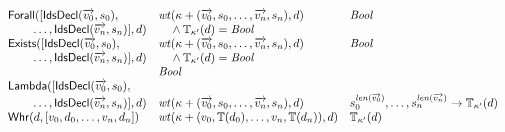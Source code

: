 \documentclass[fleqn,a4paper]{article}
\newcommand{\aterm}[1]{\mathsf{#1}}
\newcommand{\type}{\mathbb{T}}
\newcommand{\wt}{\nm{wt}}
\begin{document}
\begin{displaymath}
\begin{array}{lll}
\aterm{Forall}([\aterm{IdsDecl}(\vect{v_0},s_0),\
                                     &  \wt(\kappa+(\vect{v_0},s_0,\dots,\vect{v_n},s_n),d)       & \Bool\\
\t2\dots,\aterm{IdsDecl}(\vect{v_n},s_n)], d)
                                     & \t1\land\type_{\kappa'}(d)=\Bool                                     &\\
\aterm{Exists}([\aterm{IdsDecl}(\vect{v_0},s_0),
                                     & \wt(\kappa+(\vect{v_0},s_0,\dots,\vect{v_n},s_n),d)        & \Bool\\
\t2\dots,\aterm{IdsDecl}(\vect{v_n},s_n)], d)
                                     & \t1\land\type_{\kappa'}(d)=\Bool                                     &\\
                   & \Bool\\
\aterm{Lambda}([\aterm{IdsDecl}(\vect{v_0},s_0),\\
\t2\dots,\aterm{IdsDecl}(\vect{v_n},s_n)], d)
                                    & \wt(\kappa+(\vect{v_0},s_0,\dots,\vect{v_n},s_n),d)         & s_0^{\nm{len}(\vect{v_0})},\dots,s_n^{\nm{len}(\vect{v_n})}\to\type_{\kappa'}(d)\\
\aterm{Whr}(d,[v_0,d_0,\dots,v_n,d_n])& \wt(\kappa+(v_0,\type(d_0),\dots,v_n,\type(d_n)),d)       & \type_{\kappa'}(d)
\end{array}
\end{displaymath}
\end{document}
